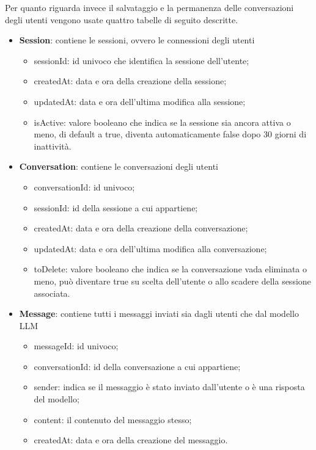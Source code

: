Per quanto riguarda invece il salvataggio e la permanenza delle conversazioni degli utenti vengono usate quattro tabelle di seguito descritte.
\begin{itemize}
    \item \textbf{Session}: contiene le sessioni, ovvero le connessioni degli utenti
    \begin{itemize}
        \item sessionId: id univoco che identifica la sessione dell'utente;
        \item createdAt: data e ora della creazione della sessione;
        \item updatedAt: data e ora dell'ultima modifica alla sessione;
        \item isActive: valore booleano che indica se la sessione sia ancora attiva o meno, di default a true, diventa automaticamente false dopo 30 giorni di inattività.
    \end{itemize} 
    \item \textbf{Conversation}: contiene le conversazioni degli utenti
    \begin{itemize}
        \item conversationId: id univoco;
        \item sessionId: id della sessione a cui appartiene;
        \item createdAt: data e ora della creazione della conversazione;
        \item updatedAt: data e ora dell'ultima modifica alla conversazione;
        \item toDelete: valore booleano che indica se la conversazione vada eliminata o meno, può diventare true su scelta dell'utente o allo scadere della sessione associata.
    \end{itemize} 
    \item \textbf{Message}: contiene tutti i messaggi inviati sia dagli utenti che dal modello LLM
    \begin{itemize}
        \item messageId: id univoco;
        \item conversationId: id della conversazione a cui appartiene;
        \item sender: indica se il messaggio è stato inviato dall'utente o è una risposta del modello;
        \item content: il contenuto del messaggio stesso;
        \item createdAt: data e ora della creazione del messaggio.
    \end{itemize} 

\end{itemize}
